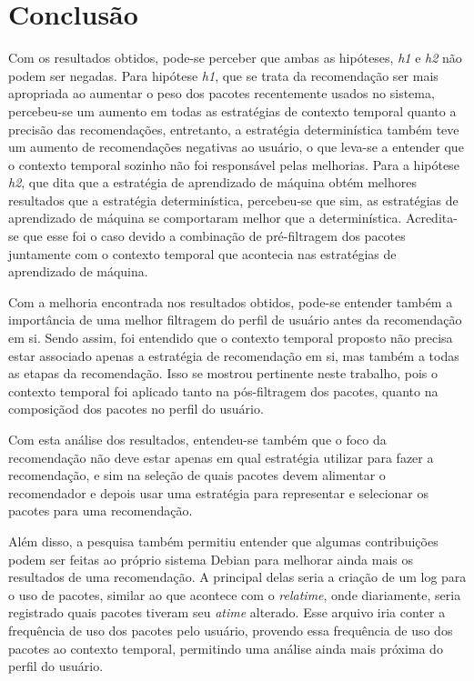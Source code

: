 \chapter[Conclusão]{Conclusão}

Com os resultados obtidos, pode-se perceber que ambas as hipóteses, \textit{h1}
e \textit{h2} não podem ser negadas. Para hipótese
\textit{h1}, que se trata da recomendação ser mais apropriada ao aumentar o
peso dos pacotes recentemente usados no sistema, percebeu-se um aumento em todas
as estratégias de contexto temporal quanto a precisão das recomendações,
entretanto, a estratégia determinística também teve um aumento de recomendações
negativas ao usuário, o que leva-se a entender que o contexto temporal sozinho
não foi responsável pelas melhorias. Para a hipótese \textit{h2}, que dita que
a estratégia de aprendizado de máquina obtém melhores resultados que a estratégia
determinística, percebeu-se que sim, as estratégias de aprendizado de máquina se
comportaram melhor que a determinística. Acredita-se que esse foi
o caso devido a combinação de pré-filtragem dos pacotes juntamente com o contexto
temporal que acontecia nas estratégias de aprendizado de máquina.

Com a melhoria encontrada nos resultados obtidos, pode-se entender também a
importância de uma melhor filtragem do perfil de usuário antes da recomendação
em si. Sendo assim, foi entendido que o contexto temporal proposto não precisa
estar associado apenas a estratégia de recomendação em si, mas também a todas as
etapas da recomendação. Isso se mostrou pertinente neste trabalho, pois o
contexto temporal foi aplicado tanto na pós-filtragem dos pacotes, quanto na
composiçãod dos pacotes no perfil do usuário.

Com esta análise dos resultados, entendeu-se também que o foco da
recomendação não deve estar apenas em qual estratégia utilizar para fazer a
recomendação, e sim na seleção de quais pacotes devem alimentar o recomendador e
depois usar uma estratégia para representar e selecionar os pacotes para uma
recomendação.

Além disso, a pesquisa também permitiu entender que algumas
contribuições podem ser feitas ao próprio sistema Debian para melhorar ainda
mais os resultados de uma recomendação. A principal delas seria a criação de um log para o uso de
pacotes, similar ao que acontece com o \textit{relatime}, onde diariamente, seria registrado
quais pacotes tiveram seu \textit{atime} alterado. Esse arquivo iria conter a frequência
de uso dos pacotes pelo usuário, provendo essa frequência de uso dos pacotes ao
contexto temporal, permitindo uma análise ainda mais próxima do perfil do usuário.

